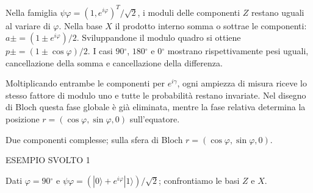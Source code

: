 Nella famiglia \(\psi \varphi =(1,\allowbreak e^{i\varphi })^{T}/\sqrt{2}\), i moduli delle componenti \(Z\) restano uguali al variare di \(\varphi \). Nella base \(X\) il prodotto interno somma o sottrae le componenti: \(a\pm =(1\pm e^{i\varphi })/2\). Sviluppandone il modulo quadro si ottiene \(p\pm =(1\pm \cos \varphi )/2\). I casi \(90{}^{\circ} \), \(180{}^{\circ} \) e \(0{}^{\circ} \) mostrano rispettivamente pesi uguali, cancellazione della somma e cancellazione della differenza.\par

Moltiplicando entrambe le componenti per \(e^{i\gamma }\), ogni ampiezza di misura riceve lo stesso fattore di modulo uno e tutte le probabilità restano invariate. Nel disegno di Bloch questa fase globale è già eliminata, mentre la fase relativa determina la posizione \(r=(\cos \varphi ,\allowbreak \sin \varphi ,\allowbreak 0)\) sull'equatore.\par



Due componenti complesse; sulla sfera di Bloch \(r=(\cos \varphi ,\allowbreak \sin \varphi ,\allowbreak 0)\).\par


\Needspace{.36\textheight}\label{c2-fase-example-1}
{\sffamily\small\color{Accent} ESEMPIO SVOLTO 1\par}
Dati \(\varphi =90{}^{\circ} \) e \(\psi \varphi =(|0\rangle +e^{i\varphi }|1\rangle )/\sqrt{2}\); confrontiamo le basi \(Z\) e \(X\).\par


